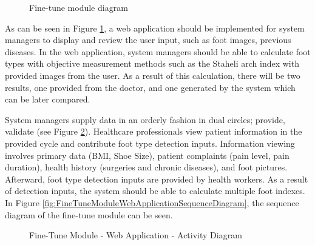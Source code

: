 \begin{figure}[htbp]
\centering
{}
\caption{Fine-tune module diagram}
\label{fig:FineTuneModuleDiagram}
\end{figure}

As can be seen in Figure \ref{fig:FineTuneModuleDiagram}, a web application should be implemented for system managers to display and review the user input, such as foot images, previous diseases. In the web application, system managers should be able to calculate foot types with objective measurement methods such as the Staheli arch index with provided images from the user. As a result of this calculation, there will be two results, one provided from the doctor, and one generated by the system which can be later compared.


System managers supply data in an orderly fashion in dual circles; provide, validate (see Figure \ref{fig:FineTuneModuleWebApplicationActivityDiagram}). Healthcare professionals view patient information in the provided cycle and contribute foot type detection inputs. Information viewing involves primary data (BMI, Shoe Size),  patient complaints (pain level, pain duration), health history (surgeries and chronic diseases), and foot pictures. Afterward, foot type detection inputs are provided by health workers. As a result of detection inputs, the system should be able to calculate multiple foot indexes. In Figure \ref{fig:FineTuneModuleWebApplicationSequenceDiagram}, the sequence diagram of the fine-tune module can be seen.

\begin{figure}[htbp]
\centering
{}
\caption{Fine-Tune Module - Web Application - Activity Diagram}
\label{fig:FineTuneModuleWebApplicationActivityDiagram}
\end{figure}

